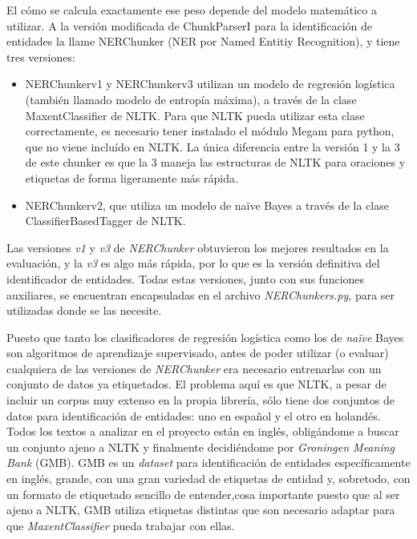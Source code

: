\documentclass{pre-tfg}
\begin{document}
El cómo se calcula exactamente ese peso depende del modelo matemático a utilizar. A la versión modificada de ChunkParserI para la identificación de entidades la llame NERChunker (NER por Named Entitiy Recognition), y tiene tres versiones:

\begin{itemize}
	\item NERChunkerv1 y NERChunkerv3 utilizan un modelo de regresión logística (también llamado modelo de entropía máxima), a través de la clase MaxentClassifier de NLTK. Para que NLTK pueda utilizar esta clase correctamente, es necesario tener instalado el módulo Megam para python, que no viene incluído en NLTK. La única diferencia entre la versión 1 y la 3 de este chunker es que la 3 maneja las estructuras de NLTK para oraciones y etiquetas de forma ligeramente más rápida.
	\item NERChunkerv2, que utiliza un modelo de naïve Bayes a través de la clase ClassifierBasedTagger de NLTK.
	
\end{itemize}

Las versiones \textit{v1} y \textit{v3} de \textit{NERChunker} obtuvieron los mejores resultados en la evaluación, y la \textit{v3} es algo más rápida, por lo que es la versión definitiva del identificador de entidades. Todas estas versiones, junto con sus funciones auxiliares, se encuentran encapsuladas en el archivo \textit{NERChunkers.py}, para ser utilizadas donde se las necesite.


Puesto que tanto los clasificadores de regresión logística como los de \textit{naïve} Bayes son algoritmos de aprendizaje supervisado, antes de poder utilizar (o evaluar) cualquiera de las versiones de \textit{NERChunker} era necesario entrenarlas con un conjunto de datos ya etiquetados. El problema aquí es que NLTK, a pesar de incluir un corpus muy extenso en la propia librería, sólo tiene dos conjuntos de datos para identificación de entidades: uno en español y el otro en holandés. Todos los textos a analizar en el proyecto están en inglés, obligándome a buscar un conjunto ajeno a NLTK y finalmente decidiéndome por \textit{Groningen Meaning Bank} (GMB). GMB es un \textit{dataset} para identificación de entidades específicamente en inglés, grande, con una gran variedad de etiquetas de entidad y, sobretodo, con un formato de etiquetado sencillo de entender,cosa importante puesto que al ser ajeno a NLTK, GMB utiliza etiquetas distintas que son necesario adaptar para que \textit{MaxentClassifier} pueda trabajar con ellas.
\end{document}
